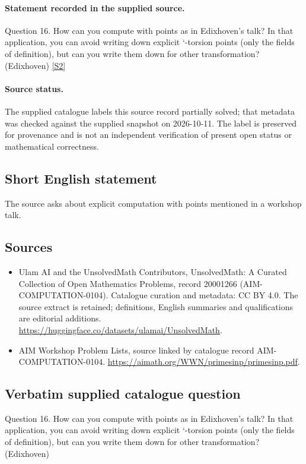 \documentclass[11pt]{article}
\begin{document}
\paragraph{Statement recorded in the supplied source.}
Question 16. How can you compute with points as in Edixhoven's talk? In that application, you can avoid writing down explicit `-torsion points (only the fields of definition), but can you write them down for other transformation? (Edixhoven) \href{https://aimath.org/WWN/primesinp/primesinp.pdf}{[S2]}
\paragraph{Source status.}
The supplied catalogue labels this source record partially solved; that metadata was checked against the supplied snapshot on 2026-10-11. The label is preserved for provenance and is not an independent verification of present open status or mathematical correctness.
\subsection{Short English statement}
The source asks about explicit computation with points mentioned in a workshop talk.
\subsection{Sources}
\begin{itemize}
\item[S1] Ulam AI and the UnsolvedMath Contributors, UnsolvedMath: A Curated Collection of Open Mathematics Problems, record 20001266 (AIM-COMPUTATION-0104). Catalogue curation and metadata: CC BY 4.0. The source extract is retained; definitions, English summaries and qualifications are editorial additions.
\url{https://huggingface.co/datasets/ulamai/UnsolvedMath}.
\item[S2] AIM Workshop Problem Lists, source linked by catalogue record AIM-COMPUTATION-0104.
\url{https://aimath.org/WWN/primesinp/primesinp.pdf}.
\end{itemize}
\subsection{Verbatim supplied catalogue question}
Question 16. How can you compute with points as in Edixhoven's talk? In that application, you can avoid writing down explicit `-torsion points (only the fields of definition), but can you write them down for other transformation? (Edixhoven)
\end{document}
